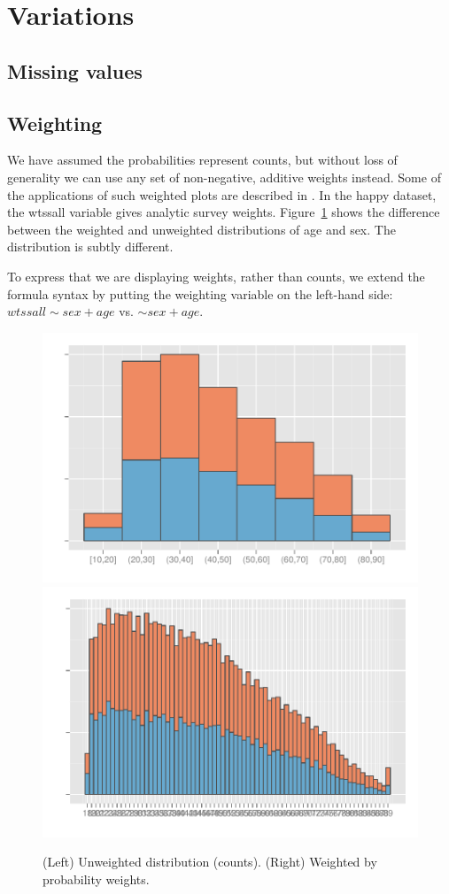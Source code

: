 \documentclass[letterpaper,oneside]{scrartcl}
\begin{document}
\section{Variations}
\label{sec:variations}

% 


\subsection{Missing values}
\label{sub:missing_values}


\subsection{Weighting}
\label{sub:weighting}

We have assumed the probabilities represent counts, but without loss of generality we can use any set of non-negative, additive weights instead. Some of the applications of such weighted plots are described in \citet{unwin:2007}. In the happy dataset, the {\sf wtssall} variable gives analytic survey weights. Figure~\ref{fig:weighting} shows the difference between the weighted and unweighted distributions of age and sex. The distribution is subtly different.

To express that we are displaying weights, rather than counts, we extend the formula syntax by putting the weighting variable on the left-hand side: $wtssall \sim sex + age$ vs. $ \sim sex + age$.

\begin{figure}[htbp]
  \centering
    \includegraphics[width=0.5\linewidth]{wt-count}%
    \includegraphics[width=0.5\linewidth]{wt-wtssall}%
  \caption{(Left) Unweighted distribution (counts).  (Right) Weighted by probability weights.}
  \label{fig:weighting}
\end{figure}
\end{document}
